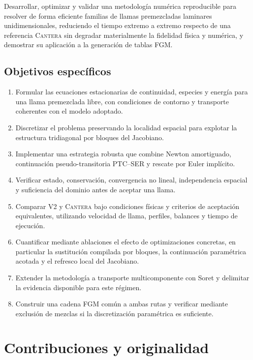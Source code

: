 \documentclass[12pt,a4paper,twoside,openany]{book}
\newcommand{\Vdos}{\textsc{V2}\xspace}
\newcommand{\Cantera}{\textsc{Cantera}\xspace}
\begin{document}
Desarrollar, optimizar y validar una metodología numérica reproducible para
resolver de forma eficiente familias de llamas premezcladas laminares
unidimensionales, reduciendo el tiempo extremo a extremo respecto de una
referencia \Cantera sin degradar materialmente la fidelidad física y numérica,
y demostrar su aplicación a la generación de tablas FGM.

\subsection{Objetivos específicos}

\begin{enumerate}
  \item Formular las ecuaciones estacionarias de continuidad, especies y
        energía para una llama premezclada libre, con condiciones de contorno y
        transporte coherentes con el modelo adoptado.
  \item Discretizar el problema preservando la localidad espacial para explotar
        la estructura tridiagonal por bloques del Jacobiano.
  \item Implementar una estrategia robusta que combine Newton amortiguado,
        continuación pseudo-transitoria PTC--SER y rescate por Euler implícito.
  \item Verificar estado, conservación, convergencia no lineal, independencia
        espacial y suficiencia del dominio antes de aceptar una llama.
  \item Comparar \Vdos y \Cantera bajo condiciones físicas y criterios de
        aceptación equivalentes, utilizando velocidad de llama, perfiles,
        balances y tiempo de ejecución.
  \item Cuantificar mediante ablaciones el efecto de optimizaciones concretas,
        en particular la sustitución compilada por bloques, la continuación
        paramétrica acotada y el refresco local del Jacobiano.
  \item Extender la metodología a transporte multicomponente con Soret y
        delimitar la evidencia disponible para este régimen.
  \item Construir una cadena FGM común a ambas rutas y verificar mediante
        exclusión de mezclas si la discretización paramétrica es suficiente.
\end{enumerate}

\section{Contribuciones y originalidad}
\end{document}
